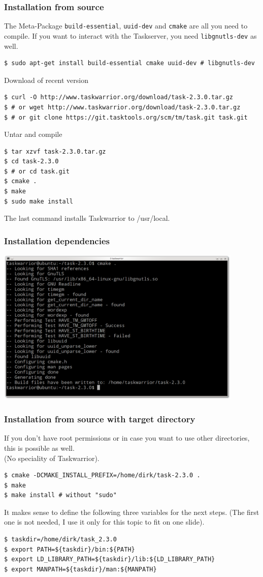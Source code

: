 \documentclass[t,handout]{beamer}
\begin{document}
\begin{frame}[fragile]\frametitle{Installation from source}
The Meta-Package \texttt{build-essential}, \texttt{uuid-dev} and \texttt{cmake} are all you need to compile. If you want to interact with the Taskserver, you need \texttt{libgnutls-dev} as well.
\begin{lstlisting}
$ sudo apt-get install build-essential cmake uuid-dev # libgnutls-dev
\end{lstlisting}
Download of recent version
\begin{lstlisting}
$ curl -O http://www.taskwarrior.org/download/task-2.3.0.tar.gz
$ # or wget http://www.taskwarrior.org/download/task-2.3.0.tar.gz
$ # or git clone https://git.tasktools.org/scm/tm/task.git task.git
\end{lstlisting}
Untar and compile
\begin{lstlisting}
$ tar xzvf task-2.3.0.tar.gz
$ cd task-2.3.0
$ # or cd task.git
$ cmake .
$ make
$ sudo make install
\end{lstlisting}
The last command installs Taskwarrior to /usr/local.
\end{frame}

\begin{frame}[fragile]\frametitle{Installation dependencies}
\begin{center} %
\includegraphics[width=11.8cm,height=7.5cm]{cmake.png}
\end{center}
\end{frame}

\begin{frame}[fragile]\frametitle{Installation from source with target directory}
If you don't have root permissions or in case you want to use other directories, this is possible as well. \\
(No speciality of Taskwarrior).
\begin{lstlisting}
$ cmake -DCMAKE_INSTALL_PREFIX=/home/dirk/task-2.3.0 .
$ make
$ make install # without "sudo"
\end{lstlisting}
It makes sense to define the following three variables for the next steps. (The first one is not needed, I use it only for this topic to fit on one slide).
\begin{lstlisting}
$ taskdir=/home/dirk/task_2.3.0
$ export PATH=${taskdir}/bin:${PATH}
$ export LD_LIBRARY_PATH=${taskdir}/lib:${LD_LIBRARY_PATH}
$ export MANPATH=${taskdir}/man:${MANPATH}
\end{lstlisting}
\end{frame}
\end{document}

